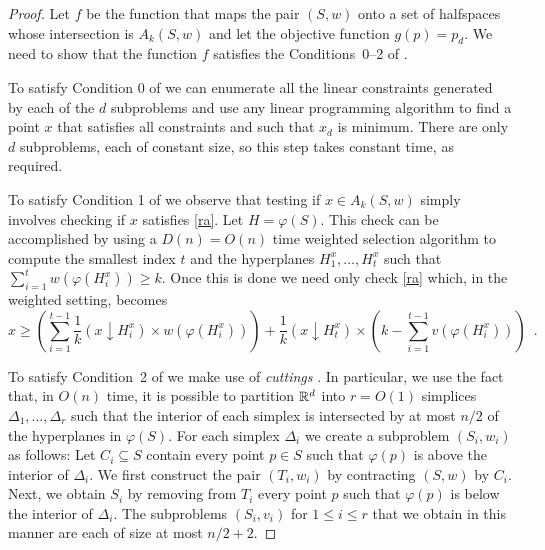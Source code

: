 \documentclass[lotsofwhite]{patmorin}
\newcommand{\drop}{\!\!\downarrow\!\!}
\newcommand{\dual}{\varphi}
\begin{document}
\begin{proof}
Let $f$ be the function that maps the pair $(S,w)$ onto a set of
halfspaces whose intersection is $A_k(S,w)$ and let the objective
function $g(p)=p_d$.  We need to show that the function $f$ satisfies
the Conditions~0--2 of .

To satisfy Condition 0 of  we can enumerate all the
linear constraints generated by each of the $d$ subproblems and use
any linear programming algorithm to find a point $x$ that satisfies
all constraints and such that $x_d$ is minimum.  There are only $d$
subproblems, each of constant size, so this step takes constant time,
as required.

To satisfy Condition 1 of 
we observe that testing if $x\in A_k(S,w)$
simply involves checking if $x$ satisfies \eqref{ra}.  Let
$H=\dual(S)$.  This check can be accomplished by using a $D(n)=O(n)$
time weighted selection algorithm \cite{X} to compute the smallest
index $t$ and the hyperplanes $H_{1}^x,\ldots,H_{t}^x$ such that
$\sum_{i=1}^tw(\dual(H_{i}^x)) \ge k$.  Once this is done we need only
check \eqref{ra} which, in the weighted setting, becomes 
\[
     x \ge \left(\sum_{i=1}^{t-1} \frac{1}{k}(x\drop
H_i^x)\times w(\dual(H_i^x))\right) 
   + \frac{1}{k}(x\drop H_t^x) \times \left(k-\sum_{i=1}^{t-1} v(\dual(H_{i}^x)) \right)
\enspace .
\]

To satisfy Condition~2 of 
we make use of \emph{cuttings} \cite{X}.  In
particular, we use the fact that, in $O(n)$ time, it is possible to
partition $\mathbb{R}^d$ into $r=O(1)$ simplices
$\Delta_1,\ldots,\Delta_r$ such that the interior of each simplex is
intersected by at most $n/2$ of the hyperplanes in $\dual(S)$.  For
each simplex $\Delta_i$ we create a subproblem $(S_i,w_i)$ as follows:
Let $C_i\subseteq S$ contain every point $p\in S$ such that $\dual(p)$
is above the interior of $\Delta_i$.  We first construct the pair
$(T_i,w_i)$ by contracting $(S,w)$ by $C_i$.  Next, we obtain $S_i$ by
removing from $T_i$ every point $p$ such that $\dual(p)$ is below the
interior of $\Delta_i$.  The subproblems $(S_i,v_i)$ for $1\le i\le r$
that we obtain in this manner are each of size at most $n/2+2$.


\end{proof}
\end{document}
